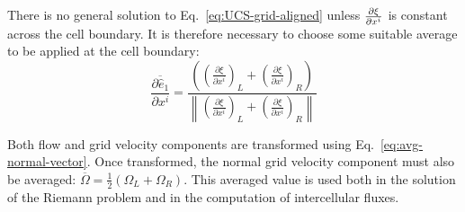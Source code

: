There is no general solution to Eq.~\ref{eq:UCS-grid-aligned} unless $\frac{\partial \xi}{\partial x^i}$ is constant across the cell boundary. It is therefore necessary to choose some suitable average to be applied at the cell boundary:
\begin{equation}
\label{eq:avg-normal-vector}
\overline {\frac{{\partial {{\hat e}_1}}}{{\partial {x^i}}}}  = \frac{{\left( {{{\left( {\frac{{\partial \xi }}{{\partial {x^i}}}} \right)}_L} + {{\left( {\frac{{\partial \xi }}{{\partial {x^i}}}} \right)}_R}} \right)}}{{\left\| {{{\left( {\frac{{\partial \xi }}{{\partial {x^i}}}} \right)}_L} + {{\left( {\frac{{\partial \xi }}{{\partial {x^i}}}} \right)}_R}} \right\|}}
\end{equation}

Both flow and grid velocity components are transformed using Eq.~\ref{eq:avg-normal-vector}. Once transformed, the normal grid velocity component must also be averaged: 
$\overline \Omega   = \frac{1}{2}\left( {{\Omega _L} + {\Omega _R}} \right)$. This averaged value is used both in the solution of the Riemann problem and in the computation of intercellular fluxes.

